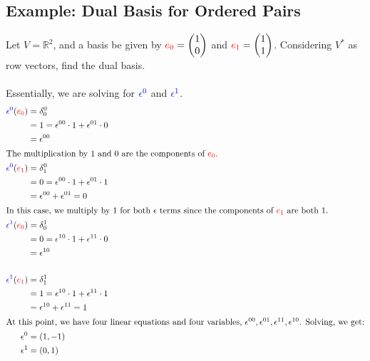 \documentclass[10pt]{article}
\newcommand{\R}{\mathbb{R}}
\begin{document}
\subsection*{Example: Dual Basis for Ordered Pairs}
Let $V = \R^2$, and a basis be given by $\textcolor{red}{e_0} = \begin{pmatrix} 1 \\ 0 \end{pmatrix}$ and $\textcolor{red}{e_1} = \begin{pmatrix} 1 \\ 1 \end{pmatrix}$.  Considering $V^*$ as row vectors, find the dual basis.\\\\
Essentially, we are solving for $\textcolor{blue}{\epsilon^0}$ and $\textcolor{blue}{\epsilon^1}$.
\begin{align*}
    \textcolor{blue}{\epsilon^0}(\textcolor{red}{e_0}) &= \delta_0^0\\
    &= 1 = \epsilon^{00} \cdot 1 + \epsilon^{01} \cdot 0 \\
    &= \epsilon^{00}\\
    \intertext{The multiplication by 1 and 0 are the components of $\textcolor{red}{e_0}$.}
    \textcolor{blue}{\epsilon^0}(\textcolor{red}{e_1}) &= \delta_1^0\\
    &= 0 = \epsilon^{00} \cdot 1 + \epsilon^{01} \cdot 1\\
    &= \epsilon^{00} + \epsilon^{01} = 0\\
    \intertext{In this case, we multiply by 1 for both $\epsilon$ terms since the components of $\textcolor{red}{e_1}$ are both 1.}
    \textcolor{blue}{\epsilon^1}(\textcolor{red}{e_0}) &= \delta_0^1\\
    &= 0 = \epsilon^{10} \cdot 1 + \epsilon^{11} \cdot 0\\
    &= \epsilon^{10}\\\\
    \textcolor{blue}{\epsilon^1}(\textcolor{red}{e_1}) &= \delta_1^1\\
    &= 1 = \epsilon^{10} \cdot 1 + \epsilon^{11} \cdot 1\\
    &= \epsilon^{10} + \epsilon^{11} = 1\\
    \intertext{At this point, we have four linear equations and four variables, $\epsilon^{00}, \epsilon^{01}, \epsilon^{11}, \epsilon^{10}$.  Solving, we get:}
    \epsilon^0 &= (1, -1)\\
    \epsilon^1 &= (0, 1)
\end{align*}
\end{document}
